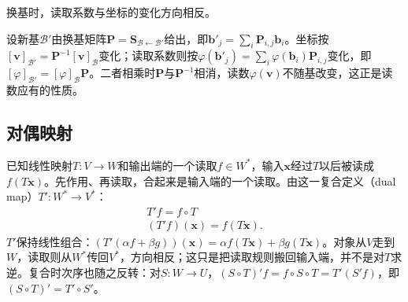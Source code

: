 换基时，读取系数与坐标的变化方向相反。

设新基$\mathcal B'$由换基矩阵$\bm P=\bm S_{\mathcal B\leftarrow\mathcal B'}$给出，即$\bm b'_j=\sum_i\bm P_{i,j}\bm b_i$。坐标按$[\bm v]_{\mathcal B'}=\bm P^{-1}[\bm v]_{\mathcal B}$变化；读取系数则按$\varphi(\bm b'_j)=\sum_i\varphi(\bm b_i)\bm P_{i,j}$变化，即$[\varphi]_{\mathcal B'}=[\varphi]_{\mathcal B}\bm P$。二者相乘时$\bm P$与$\bm P^{-1}$相消，读数$\varphi(\bm v)$不随基改变，这正是读数应有的性质。

\subsection{对偶映射}
\label{sec:ls-dual-map}

已知线性映射$T:V\to W$和输出端的一个读取$f\in W^*$，输入$\bm x$经过$T$以后被读成$f(T\bm x)$。先作用、再读取，合起来是输入端的一个读取。由这一复合定义（dual map）$T':W^*\to V^*$：
\begin{equation}
\begin{gathered}
T'f=f\circ T\\
(T'f)(\bm x)=f(T\bm x).
\end{gathered}
\label{eq:ls-dual-map-def}
\end{equation}
$T'$保持线性组合：$(T'(\alpha f+\beta g))(\bm x)=\alpha f(T\bm x)+\beta g(T\bm x)$。对象从$V$走到$W$，读取则从$W^*$传回$V^*$，方向相反；这只是把读取规则搬回输入端，并不是对$T$求逆。复合时次序也随之反转：对$S:W\to U$，$(S\circ T)'f=f\circ S\circ T=T'(S'f)$，即$(S\circ T)'=T'\circ S'$。

